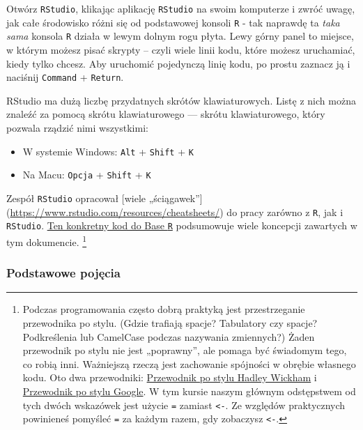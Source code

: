 \documentclass[
]{article}
\providecommand{\tightlist}{%
  \setlength{\itemsep}{0pt}\setlength{\parskip}{0pt}}
\begin{document}
Otwórz \texttt{RStudio}, klikając aplikację \texttt{RStudio} na swoim
komputerze i zwróć uwagę, jak całe środowisko różni się od podstawowej
konsoli \texttt{R} - tak naprawdę ta \emph{taka sama} konsola \texttt{R}
działa w lewym dolnym rogu płyta. Lewy górny panel to miejsce, w którym
możesz pisać skrypty -- czyli wiele linii kodu, które możesz uruchamiać,
kiedy tylko chcesz. Aby uruchomić pojedynczą linię kodu, po prostu
zaznacz ją i naciśnij \texttt{Command} + \texttt{Return}.

RStudio ma dużą liczbę przydatnych skrótów klawiaturowych. Listę z nich
można znaleźć za pomocą skrótu klawiaturowego --- skrótu klawiaturowego,
który pozwala rządzić nimi wszystkimi:

\begin{itemize}
\tightlist
\item
  W systemie Windows: \texttt{Alt} + \texttt{Shift} + \texttt{K}
\item
  Na Macu: \texttt{Opcja} + \texttt{Shift} + \texttt{K}
\end{itemize}

Zespół \texttt{RStudio} opracował {[}wiele „ściągawek''{]}
(\url{https://www.rstudio.com/resources/cheatsheets/}) do pracy zarówno
z \texttt{R}, jak i \texttt{RStudio}.
\href{http://www.rstudio.com/wp-content/uploads/2016/05/base-r.pdf}{Ten
konkretny kod do Base \texttt{R}} podsumowuje wiele koncepcji zawartych
w tym dokumencie. \footnote{Podczas programowania często dobrą praktyką
  jest przestrzeganie przewodnika po stylu. (Gdzie trafiają spacje?
  Tabulatory czy spacje? Podkreślenia lub CamelCase podczas nazywania
  zmiennych?) Żaden przewodnik po stylu nie jest „poprawny'', ale pomaga
  być świadomym tego, co robią inni. Ważniejszą rzeczą jest zachowanie
  spójności w obrębie własnego kodu. Oto dwa przewodniki:
  \href{http://adv-r.had.co.nz/Style.html}{Przewodnik po stylu Hadley
  Wickham} i
  \href{https://google.github.io/styleguide\%20/Rguide.xml}{Przewodnik
  po stylu Google}. W tym kursie naszym głównym odstępstwem od tych
  dwóch wskazówek jest użycie \texttt{=} zamiast \texttt{\textless{}-}.
  Ze względów praktycznych powinieneś pomyśleć \texttt{=} za każdym
  razem, gdy zobaczysz \texttt{\textless{}-}.}

\hypertarget{podstawowe-pojux119cia}{%
\subsubsection{Podstawowe pojęcia}\label{podstawowe-pojux119cia}}
\end{document}
